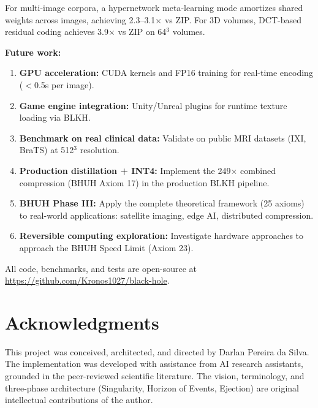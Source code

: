 \documentclass[11pt,a4paper]{article}
\begin{document}
For multi-image corpora, a hypernetwork meta-learning mode amortizes shared weights across images, achieving 2.3--3.1$\times$ vs ZIP. For 3D volumes, DCT-based residual coding achieves 3.9$\times$ vs ZIP on 64$^3$ volumes.

\textbf{Future work:}
\begin{enumerate}
    \item \textbf{GPU acceleration:} CUDA kernels and FP16 training for real-time encoding ($<$0.5s per image).
    \item \textbf{Game engine integration:} Unity/Unreal plugins for runtime texture loading via BLKH.
    \item \textbf{Benchmark on real clinical data:} Validate on public MRI datasets (IXI, BraTS) at 512$^3$ resolution.
    \item \textbf{Production distillation + INT4:} Implement the 249$\times$ combined compression (BHUH Axiom 17) in the production BLKH pipeline.
    \item \textbf{BHUH Phase III:} Apply the complete theoretical framework (25 axioms) to real-world applications: satellite imaging, edge AI, distributed compression.
    \item \textbf{Reversible computing exploration:} Investigate hardware approaches to approach the BHUH Speed Limit (Axiom 23).
\end{enumerate}

All code, benchmarks, and tests are open-source at \url{https://github.com/Kronos1027/black-hole}.

\section*{Acknowledgments}

This project was conceived, architected, and directed by Darlan Pereira da Silva. The implementation was developed with assistance from AI research assistants, grounded in the peer-reviewed scientific literature. The vision, terminology, and three-phase architecture (Singularity, Horizon of Events, Ejection) are original intellectual contributions of the author.
\end{document}
